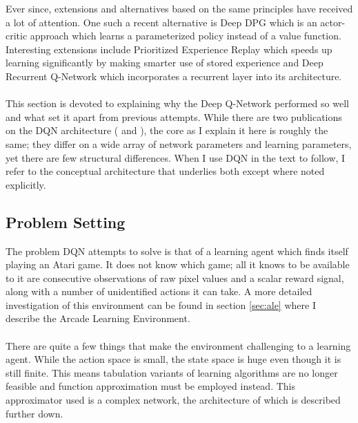Ever since,
extensions and
alternatives based on the same principles
have received a lot of attention.
One such a recent alternative is
Deep DPG
\parencite{Lillicrap2016}
which is an actor-critic approach
which learns a parameterized policy
instead of a value function.
Interesting extensions include
Prioritized Experience Replay
\parencite{Schaul2016}
which speeds up learning significantly
by making smarter use of stored experience
and
Deep Recurrent Q-Network
\parencite{Hausknecht2015}
which incorporates
a recurrent layer into its architecture.

\paragraph{}
This section is devoted to explaining why the Deep Q-Network
performed so well and what set it apart from previous attempts.
While there are two publications on the DQN architecture
(\citeyear{Mnih2013} and \citeyear{Mnih2015}),
the core as I explain it here is roughly the same;
they differ on a wide array of network parameters and learning parameters,
yet there are few structural differences.
When I use DQN in the text to follow,
I refer to the conceptual architecture that underlies both
except where noted explicitly.

\subsection{Problem Setting}
\label{sub:dqn_problem_setting}
The problem DQN attempts to solve
is that of a learning agent which finds itself playing an Atari game.
It does not know which game;
all it knows to be available to it
are consecutive observations of raw pixel values
and a scalar reward signal,
along with a number of unidentified actions it can take.
A more detailed investigation of this environment
can be found in section \ref{sec:ale}
where I describe the Arcade Learning Environment.

\paragraph{}
There are quite a few things that make the environment
challenging to a learning agent.
While the action space is small,
the state space is huge even though it is still finite.
This means tabulation variants of learning algorithms
are no longer feasible and function approximation must be employed instead.
This approximator used is a complex network,
the architecture of which is described further down.

